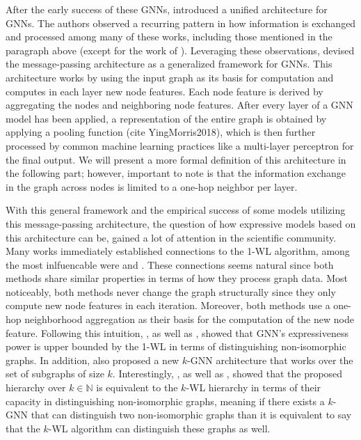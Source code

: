 After the early success of these GNNs, \cite{Gil+2017} introduced a unified architecture for GNNs. The authors observed a recurring pattern in how information is exchanged and processed among many of these works, including those mentioned in the paragraph above (except for the work of  \cite{Atwood2016}). Leveraging these observations, \cite{Gil+2017} devised the message-passing architecture as a generalized framework for GNNs. This architecture works by using the input graph as its basis for computation and computes in each layer new node features. Each node feature is derived by aggregating the nodes and neighboring node features. After every layer of a GNN model has been applied, a representation of the entire graph is obtained by applying a pooling function (cite YingMorris2018), which is then further processed by common machine learning practices like a multi-layer perceptron for the final output. We will present a more formal definition of this architecture in the following part; however, important to note is that the information exchange in the graph across nodes is limited to a one-hop neighbor per layer.

With this general framework and the empirical success of some models utilizing this message-passing architecture, the question of how expressive models based on this architecture can be, gained a lot of attention in the scientific community. Many works immediately established connections to the 1-WL algorithm, among the most inlfuencable were \cite{Morris2018} and \cite{Xu2018}. These connections seems natural since both methods share similar properties in terms of how they process graph data. Most noticeably, both methods never change the graph structurally since they only compute new node features in each iteration. Moreover, both methods use a one-hop neighborhood aggregation as their basis for the computation of the new node feature. Following this intuition, \cite{Morris2018}, as well as \cite{Xu2018}, showed that GNN's expressiveness power is upper bounded by the 1-WL in terms of distinguishing non-isomorphic graphs. In addition, \cite{Morris2018} also proposed a new $k$-GNN architecture that works over the set of subgraphs of size $k$. Interestingly, \cite{Geerts2020}, as well as \cite{Gro2017}, showed that the proposed hierarchy over $k \in \mathbb{N}$ is equivalent to the $k$-WL hierarchy in terms of their capacity in distinguishing non-isomorphic graphs, meaning if there exists a $k$-GNN that can distinguish two non-isomorphic graphs than it is equivalent to say that the $k$-WL algorithm can distinguish these graphs as well.

